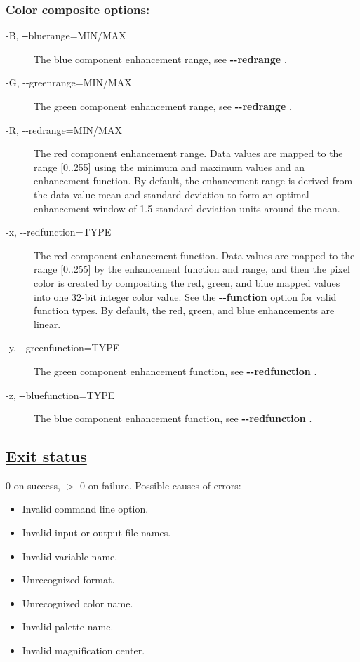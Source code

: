 \subsubsection*{Color composite options:}
\begin{description}
\item[-B, -{-}bluerange=MIN/MAX]The blue component enhancement range, see \textbf{-{-}redrange}
.
\item[-G, -{-}greenrange=MIN/MAX]The green component enhancement range, see \textbf{-{-}redrange}
.
\item[-R, -{-}redrange=MIN/MAX]The red component enhancement range. Data values are mapped to the range [0..255] using the minimum and maximum values and an enhancement function. By default, the enhancement range is derived from the data value mean and standard deviation to form an optimal enhancement window of 1.5 standard deviation units around the mean.
\item[-x, -{-}redfunction=TYPE]The red component enhancement function. Data values are mapped to the range [0..255] by the enhancement function and range, and then the pixel color is created by compositing the red, green, and blue mapped values into one 32-bit integer color value. See the \textbf{-{-}function}
 option for valid function types. By default, the red, green, and blue enhancements are linear.
\item[-y, -{-}greenfunction=TYPE]The green component enhancement function, see \textbf{-{-}redfunction}
.
\item[-z, -{-}bluefunction=TYPE]The blue component enhancement function, see \textbf{-{-}redfunction}
.

\end{description}
\subsection*{\underline{Exit status}}


 0 on success, $>$ 0 on failure. Possible causes of errors:
\begin{itemize}
\item  Invalid command line option. 
\item  Invalid input or output file names. 
\item  Invalid variable name. 
\item  Unrecognized format. 
\item  Unrecognized color name. 
\item  Invalid palette name. 
\item  Invalid magnification center. 

\end{itemize}
